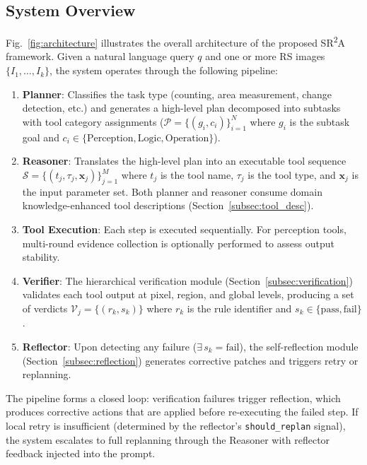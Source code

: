 \documentclass[journal]{IEEEtran}
\begin{document}
\subsection{System Overview}
\label{subsec:overview}

Fig.~\ref{fig:architecture} illustrates the overall architecture of the proposed SR\textsuperscript{2}A framework.
Given a natural language query $q$ and one or more RS images $\{I_1, \ldots, I_k\}$, the system operates through the following pipeline:

\begin{enumerate}[leftmargin=*]
    \item \textbf{Planner}: Classifies the task type (counting, area measurement, change detection, etc.) and generates a high-level plan decomposed into subtasks with tool category assignments ($\mathcal{P} = \{(g_i, c_i)\}_{i=1}^{N}$ where $g_i$ is the subtask goal and $c_i \in \{\text{Perception}, \text{Logic}, \text{Operation}\}$).
    \item \textbf{Reasoner}: Translates the high-level plan into an executable tool sequence $\mathcal{S} = \{(t_j, \tau_j, \mathbf{x}_j)\}_{j=1}^{M}$ where $t_j$ is the tool name, $\tau_j$ is the tool type, and $\mathbf{x}_j$ is the input parameter set. Both planner and reasoner consume domain knowledge-enhanced tool descriptions (Section~\ref{subsec:tool_desc}).
    \item \textbf{Tool Execution}: Each step is executed sequentially. For perception tools, multi-round evidence collection is optionally performed to assess output stability.
    \item \textbf{Verifier}: The hierarchical verification module (Section~\ref{subsec:verification}) validates each tool output at pixel, region, and global levels, producing a set of verdicts $\mathcal{V}_j = \{(r_k, s_k)\}$ where $r_k$ is the rule identifier and $s_k \in \{\text{pass}, \text{fail}\}$.
    \item \textbf{Reflector}: Upon detecting any failure ($\exists\, s_k = \text{fail}$), the self-reflection module (Section~\ref{subsec:reflection}) generates corrective patches and triggers retry or replanning.
\end{enumerate}

The pipeline forms a closed loop: verification failures trigger reflection, which produces corrective actions that are applied before re-executing the failed step.
If local retry is insufficient (determined by the reflector's \texttt{should\_replan} signal), the system escalates to full replanning through the Reasoner with reflector feedback injected into the prompt.
\end{document}
